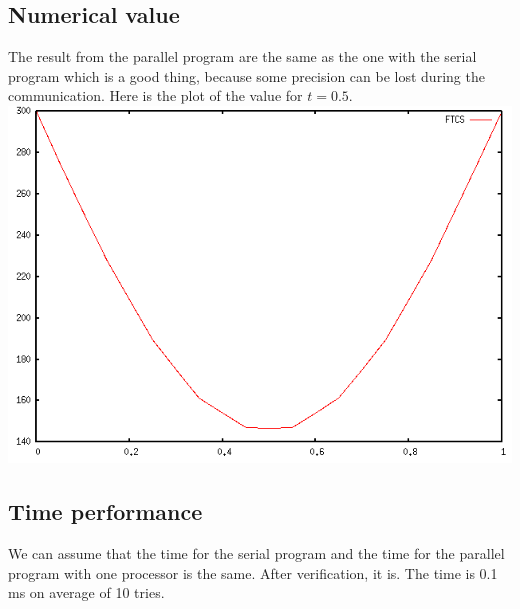 \documentclass[12pt, a4paper]{report}
\begin{document}
\subsection{Numerical value}
	The result from the parallel program are the same as the one with the serial program which is a good thing, because some precision can be lost during the communication. Here is the plot of the value for $t=0.5$.\\
\includegraphics[scale=0.5]{report/FTCS}
\subsection{Time performance}
We can assume that the time for the serial program and the time for the parallel program with one processor is the same. After verification, it is. The time is 0.1 ms on average of 10 tries.
\end{document}
